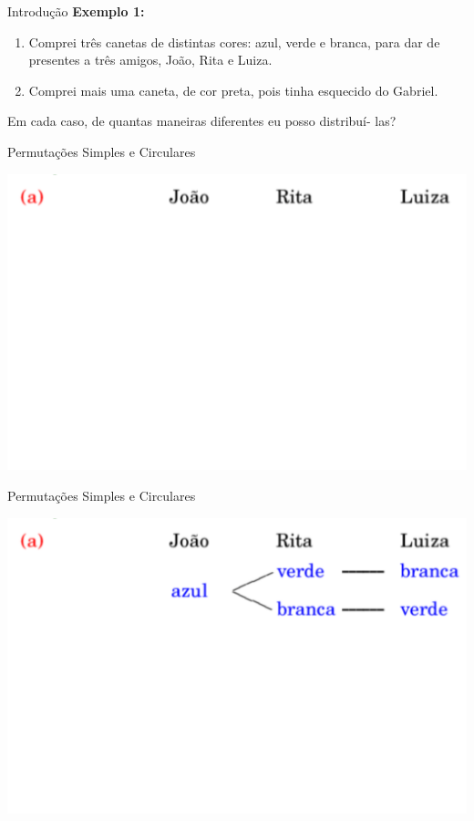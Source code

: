 \documentclass[aspectratio=169]{beamer}
\begin{document}
\begin{frame}{Introdução}
    \textbf{Exemplo 1:}

    \vspace{4mm}

    \begin{enumerate}[a]
        \item Comprei três canetas de distintas cores: azul, verde e
        branca, para dar de presentes a três amigos, João, Rita e
        Luiza.
        \item Comprei mais uma caneta, de cor preta, pois tinha
        esquecido do Gabriel.
    \end{enumerate}

    \vspace{5mm}
    Em cada caso, de quantas maneiras diferentes eu posso distribuí-
las?
\end{frame}

\begin{frame}{Permutações Simples e Circulares}
    \begin{center}
        \includegraphics[width=0.73\linewidth]{figs/Exemplo1_1.png}
    \end{center}
\end{frame}

\begin{frame}{Permutações Simples e Circulares}
    \begin{center}
        \includegraphics[width=0.73\linewidth]{figs/Exemplo1_2.png}
    \end{center}
\end{frame}
\end{document}
